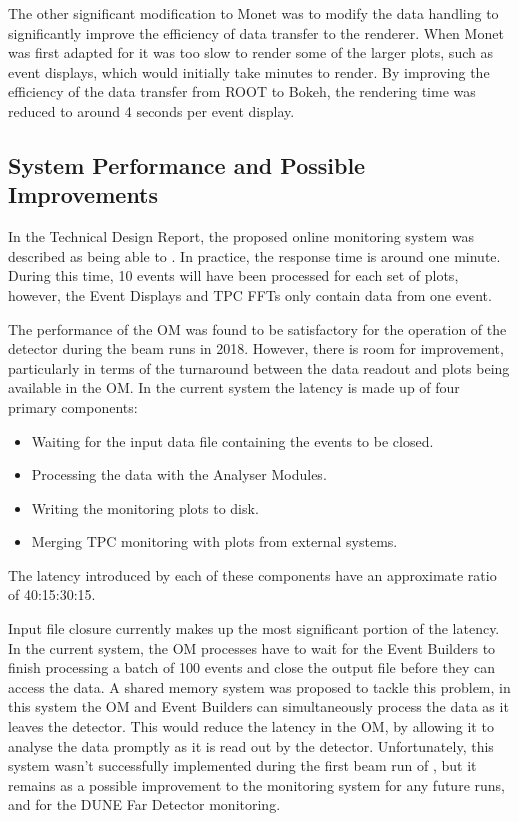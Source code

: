 The other significant modification to Monet was to modify the data handling to 
significantly improve the efficiency of data transfer to the renderer.
When Monet was first adapted for \protodune{} it was too slow to render some 
of the larger plots, such as event displays, which would initially take 
minutes to render. By improving the efficiency of the data transfer from ROOT 
to Bokeh, the rendering time was reduced to around 4 seconds per event display.

\subsection{System Performance and Possible Improvements}
In the \protodune{} Technical Design Report\cite{Abi:2017aow}, the proposed 
online monitoring system was described as being able to . In practice, the response time is around one 
minute. During this time, 10 events will have been processed for each set of 
plots, however, the Event Displays and TPC FFTs only contain data from one 
event.

The performance of the OM was found to be satisfactory for the operation of the
\protodune{} detector during the beam runs in 2018. However, there is room for
improvement, particularly in terms of the turnaround between the data readout 
and plots being available in the OM. In the current system the latency is made 
up of four primary components:
\begin{itemize}
	\item Waiting for the input data file containing the events to be closed.
	\item Processing the data with the Analyser Modules.
	\item Writing the monitoring plots to disk.
	\item Merging TPC monitoring with plots from external systems.
\end{itemize}
The latency introduced by each of these components have an approximate ratio of 
40:15:30:15. 

Input file closure currently makes up the most significant portion 
of the latency. In the current system, the OM processes have to wait for the 
Event Builders to finish processing a batch of 100 events and close the output 
file before they can access the data. A shared memory system was proposed to 
tackle this problem, in this system the OM and Event Builders can 
simultaneously process the data as it leaves the detector. This would reduce 
the latency in the OM, by allowing it to analyse the data promptly as it is 
read out by the detector. Unfortunately, this system wasn't successfully 
implemented during the first beam run of \protodune{}, but it remains as a 
possible improvement to the monitoring system for any future \protodune{} 
runs, and for the DUNE Far Detector monitoring.

